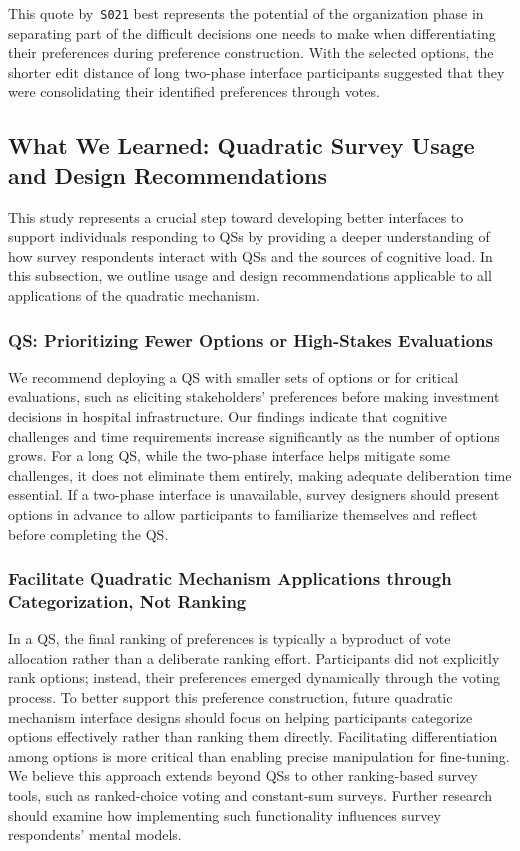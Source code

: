This quote by~\texttt{S021} best represents the potential of the organization phase in separating part of the difficult decisions one needs to make when differentiating their preferences during preference construction. With the selected options, the shorter edit distance of long two-phase interface participants suggested that they were consolidating their identified preferences through votes.



\subsection{What We Learned: Quadratic Survey Usage and Design Recommendations}
This study represents a crucial step toward developing better interfaces to support individuals responding to QSs by providing a deeper understanding of how survey respondents interact with QSs and the sources of cognitive load. In this subsection, we outline usage and design recommendations applicable to all applications of the quadratic mechanism.

\subsubsection{QS: Prioritizing Fewer Options or High-Stakes Evaluations}
We recommend deploying a QS with smaller sets of options or for critical evaluations, such as eliciting stakeholders' preferences before making investment decisions in hospital infrastructure. Our findings indicate that cognitive challenges and time requirements increase significantly as the number of options grows. For a long QS, while the two-phase interface helps mitigate some challenges, it does not eliminate them entirely, making adequate deliberation time essential. If a two-phase interface is unavailable, survey designers should present options in advance to allow participants to familiarize themselves and reflect before completing the QS.

\subsubsection{Facilitate Quadratic Mechanism Applications through Categorization, Not Ranking}
In a QS, the final ranking of preferences is typically a byproduct of vote allocation rather than a deliberate ranking effort. Participants did not explicitly rank options; instead, their preferences emerged dynamically through the voting process. To better support this preference construction, future quadratic mechanism interface designs should focus on helping participants categorize options effectively rather than ranking them directly. Facilitating differentiation among options is more critical than enabling precise manipulation for fine-tuning. We believe this approach extends beyond QSs to other ranking-based survey tools, such as ranked-choice voting and constant-sum surveys. Further research should examine how implementing such functionality influences survey respondents' mental models.


